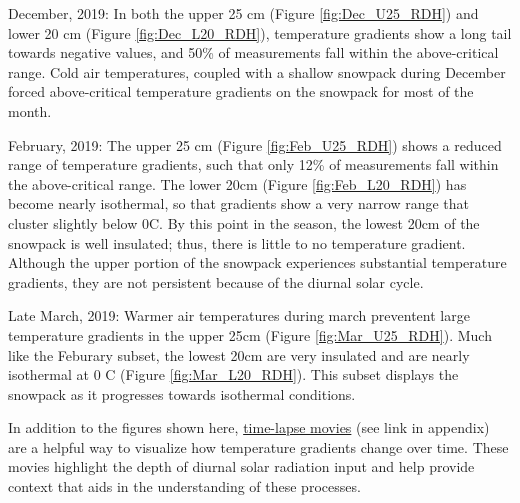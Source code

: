 December, 2019: In both the upper 25 cm (Figure \ref{fig:Dec_U25_RDH}) and lower 20 cm (Figure \ref{fig:Dec_L20_RDH}), temperature gradients show a long tail towards negative values, and 50\% of measurements fall within the above-critical range. Cold air temperatures, coupled with a shallow snowpack during December forced above-critical temperature gradients on the snowpack for most of the month. 

February, 2019: The upper 25 cm (Figure \ref{fig:Feb_U25_RDH}) shows a reduced range of temperature gradients, such that only 12\% of measurements fall within the above-critical range. The lower 20cm (Figure \ref{fig:Feb_L20_RDH}) has become nearly isothermal, so that gradients show a very narrow range that cluster slightly below 0\textdegree C. By this point in the season, the lowest 20cm of the snowpack is well insulated; thus, there is little to no temperature gradient. Although the upper portion of the snowpack experiences substantial temperature gradients, they are not persistent because of the diurnal solar cycle. 

Late March, 2019: Warmer air temperatures during march preventent large temperature gradients in the upper 25cm (Figure \ref{fig:Mar_U25_RDH}). Much like the Feburary subset, the lowest 20cm are very insulated and are nearly isothermal at 0 \textdegree C (Figure \ref{fig:Mar_L20_RDH}). This subset displays the snowpack as it progresses towards isothermal conditions. 

In addition to the figures shown here, \href{https://www.youtube.com/playlist?list=PLN7P9tpWCRZofzf19t5gqyeo645Kbmsac}{time-lapse movies} (see link in appendix) are a helpful way to visualize how temperature gradients change over time. These movies highlight the depth of diurnal solar radiation input and help provide context that aids in the understanding of these processes.

